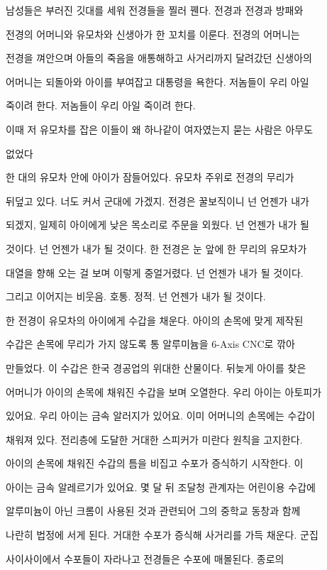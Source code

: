 남성들은 부러진 깃대를 세워 전경들을 찔러 꿴다. 전경과 전경과 방패와

전경의 어머니와 유모차와 신생아가 한 꼬치를 이룬다. 전경의 어머니는

전경을 껴안으며 아들의 죽음을 애통해하고 사거리까지 달려갔던 신생아의

어머니는 되돌아와 아이를 부여잡고 대통령을 욕한다. 저놈들이 우리 아일

죽이려 한다. 저놈들이 우리 아일 죽이려 한다.



이때 저 유모차를 잡은 이들이 왜 하나같이 여자였는지 묻는 사람은 아무도

없었다



한 대의 유모차 안에 아이가 잠들어있다. 유모차 주위로 전경의 무리가

뒤덮고 있다. 너도 커서 군대에 가겠지. 전경은 꿀보직이니 넌 언젠가 내가

되겠지, 일제히 아이에게 낮은 목소리로 주문을 외웠다. 넌 언젠가 내가 될

것이다. 넌 언젠가 내가 될 것이다. 한 전경은 눈 앞에 한 무리의 유모차가

대열을 향해 오는 걸 보며 이렇게 중얼거렸다. 넌 언젠가 내가 될 것이다.

그리고 이어지는 비웃음. 호통. 정적. 넌 언젠가 내가 될 것이다.



한 전경이 유모차의 아이에게 수갑을 채운다. 아이의 손목에 맞게 제작된

수갑은 손목에 무리가 가지 않도록 통 알루미늄을 6-Axis CNC로 깎아

만들었다. 이 수갑은 한국 경공업의 위대한 산물이다. 뒤늦게 아이를 찾은

어머니가 아이의 손목에 채워진 수갑을 보며 오열한다. 우리 아이는 아토피가

있어요. 우리 아이는 금속 알러지가 있어요. 이미 어머니의 손목에는 수갑이

채워져 있다. 전리층에 도달한 거대한 스피커가 미란다 원칙을 고지한다.

아이의 손목에 채워진 수갑의 틈을 비집고 수포가 증식하기 시작한다. 이

아이는 금속 알레르기가 있어요. 몇 달 뒤 조달청 관계자는 어린이용 수갑에

알루미늄이 아닌 크롬이 사용된 것과 관련되어 그의 중학교 동창과 함께

나란히 법정에 서게 된다. 거대한 수포가 증식해 사거리를 가득 채운다. 군집

사이사이에서 수포들이 자라나고 전경들은 수포에 매몰된다. 종로의

